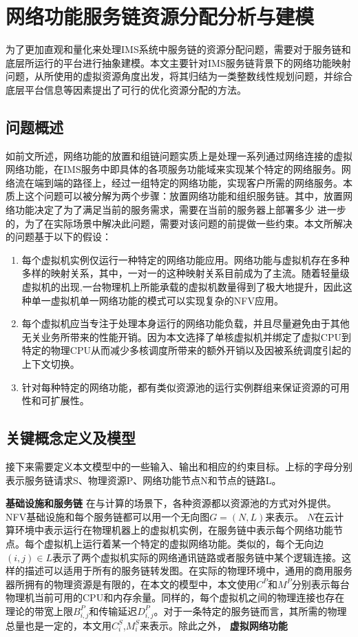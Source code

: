 \chapter{网络功能服务链资源分配分析与建模}
为了更加直观和量化来处理IMS系统中服务链的资源分配问题，需要对于服务链和底层所运行的平台进行抽象建模。本文主要针对IMS服务链背景下的网络功能映射问题，从所使用的虚拟资源角度出发，将其归结为一类整数线性规划问题，并综合底层平台信息等因素提出了可行的优化资源分配的方法。

\section{问题概述}


如前文所述，网络功能的放置和组链问题实质上是处理一系列通过网络连接的虚拟网络功能，在IMS服务中即具体的各项服务功能域来实现某个特定的网络服务。网络流在端到端的路径上，经过一组特定的网络功能，实现客户所需的网络服务。本质上这个问题可以被分解为两个步骤：放置网络功能和组织服务链。其中，放置网络功能决定了为了满足当前的服务需求，需要在当前的服务器上部署多少
进一步的，为了在实际场景中解决此问题，需要对该问题的前提做一些约束。本文所解决的问题基于以下的假设：
\begin{enumerate}
	\item 每个虚拟机实例仅运行一种特定的网络功能应用。网络功能与虚拟机存在多种多样的映射关系，其中，一对一的这种映射关系目前成为了主流。随着轻量级虚拟机的出现\cite{martin s2014clickos,manco2017my},一台物理机上所能承载的虚拟机数量得到了极大地提升，因此这种单一虚拟机单一网络功能的模式可以实现复杂的NFV应用。
	\item  每个虚拟机应当专注于处理本身运行的网络功能负载，并且尽量避免由于其他无关业务所带来的性能开销。因为本文选择了单核虚拟机并绑定了虚拟CPU到特定的物理CPU从而减少多核调度所带来的额外开销以及因被系统调度引起的上下文切换。
	\item 针对每种特定的网络功能，都有类似资源池的运行实例群组来保证资源的可用性和可扩展性。
\end{enumerate}


\section{关键概念定义及模型}
接下来需要定义本文模型中的一些输入、输出和相应的约束目标。上标的字母分别表示服务链请求S、物理资源P、网络功能节点N和节点的链路L。

\textbf{基础设施和服务链} 在与计算的场景下，各种资源都以资源池的方式对外提供。NFV基础设施和每个服务链都可以用一个无向图$G = (N,L)$来表示。 $N$在云计算环境中表示运行在物理机器上的虚拟机实例，在服务链中表示每个网络功能节点。每个虚拟机上运行着某一个特定的虚拟网络功能。类似的，每个无向边$(i,j) \in L$表示了两个虚拟机实际的网络通讯链路或者服务链中某个逻辑连接。这样的描述可以适用于所有的服务链转发图。在实际的物理环境中，通用的商用服务器所拥有的物理资源是有限的，在本文的模型中，本文使用$C^{P}$和$M^{P}$分别表示每台物理机当前可用的CPU和内存余量。同样的，每个虚拟机之间的物理连接也存在理论的带宽上限$B_{i,j}^{P}$和传输延迟$D_{i,j}^{P}$。对于一条特定的服务链而言，其所需的物理总量也是一定的，本文用$C_{i}^{S}$,$M_{i}^{S}$来表示。除此之外，
\textbf{虚拟网络功能}


